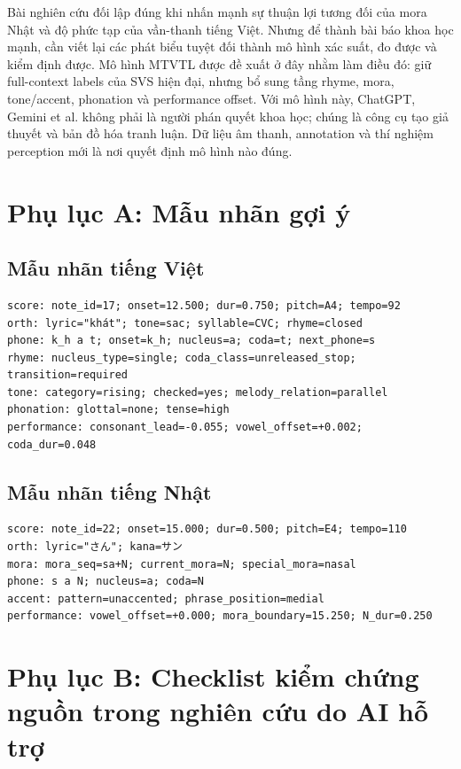 \documentclass[12pt,a4paper]{article}
\begin{document}
Bài nghiên cứu đối lập đúng khi nhấn mạnh sự thuận lợi tương đối của mora Nhật và độ phức tạp của vần-thanh tiếng Việt. Nhưng để thành bài báo khoa học mạnh, cần viết lại các phát biểu tuyệt đối thành mô hình xác suất, đo được và kiểm định được. Mô hình MTVTL được đề xuất ở đây nhằm làm điều đó: giữ full-context labels của SVS hiện đại, nhưng bổ sung tầng rhyme, mora, tone/accent, phonation và performance offset. Với mô hình này, ChatGPT, Gemini et al. không phải là người phán quyết khoa học; chúng là công cụ tạo giả thuyết và bản đồ hóa tranh luận. Dữ liệu âm thanh, annotation và thí nghiệm perception mới là nơi quyết định mô hình nào đúng.

\appendix
\section{Phụ lục A: Mẫu nhãn gợi ý}

\subsection{Mẫu nhãn tiếng Việt}

\begin{Verbatim}[breaklines=true,fontsize=\small]
score: note_id=17; onset=12.500; dur=0.750; pitch=A4; tempo=92
orth: lyric="khát"; tone=sac; syllable=CVC; rhyme=closed
phone: k_h a t; onset=k_h; nucleus=a; coda=t; next_phone=s
rhyme: nucleus_type=single; coda_class=unreleased_stop; transition=required
tone: category=rising; checked=yes; melody_relation=parallel
phonation: glottal=none; tense=high
performance: consonant_lead=-0.055; vowel_offset=+0.002; coda_dur=0.048
\end{Verbatim}

\subsection{Mẫu nhãn tiếng Nhật}

\begin{Verbatim}[breaklines=true,fontsize=\small]
score: note_id=22; onset=15.000; dur=0.500; pitch=E4; tempo=110
orth: lyric="さん"; kana=サン
mora: mora_seq=sa+N; current_mora=N; special_mora=nasal
phone: s a N; nucleus=a; coda=N
accent: pattern=unaccented; phrase_position=medial
performance: vowel_offset=+0.000; mora_boundary=15.250; N_dur=0.250
\end{Verbatim}

\section{Phụ lục B: Checklist kiểm chứng nguồn trong nghiên cứu do AI hỗ trợ}
\end{document}
